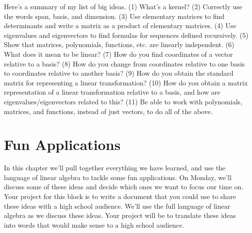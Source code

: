 \documentclass[letterpaper,oneside]{book}%
\theoremstyle{plain}
\theoremstyle{box}
\theoremstyle{problem}
\begin{document}
Here's a summary of my list of big ideas.  (1) What's a kernel? (2) Correctly use the words span, basis, and dimension. (3) Use elementary matrices to find determinants and write a matrix as a product of elementary matrices. (4) Use eigenvalues and eigenvectors to find formulas for sequences defined recursively. (5) Show that matrices, polynomials, functions, etc. are linearly independent. (6) What does it mean to be linear? (7) How do you find coordinates of a vector relative to a basis? (8) How do you change from coordinates relative to one basis to coordinates relative to another basis? (9) How do you obtain the standard matrix for representing a linear transformation? (10) How do you obtain a matrix representation of a linear transformation relative to a basis, and how are eigenvalues/eigenvectors related to this? (11) Be able to work with polynomials, matrices, and functions, instead of just vectors, to do all of the above. 



\chapter{Fun Applications}
In this chapter we'll pull together everything we have learned, and use the language of linear algebra to tackle some fun applications. On Monday, we'll discuss some of these ideas and decide which ones we want to focus our time on.  Your project for this block is to write a document that you could use to share these ideas with a high school audience.  We'll use the full language of linear algebra as we discuss these ideas.  Your project will be to translate these ideas into words that would make sense to a high school audience.
\end{document}
